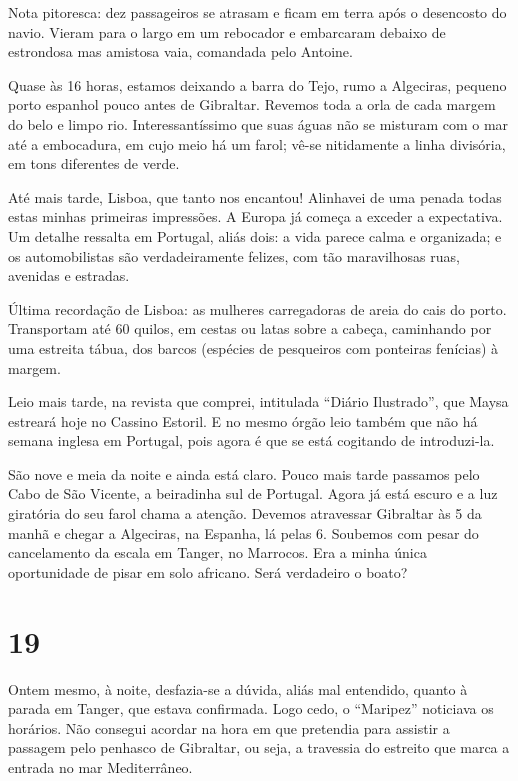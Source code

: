 Nota pitoresca: dez passageiros se atrasam e ficam em terra após o desencosto do navio. Vieram para o largo em um rebocador e embarcaram debaixo de estrondosa mas amistosa vaia, comandada pelo Antoine.

Quase às 16 horas, estamos deixando a barra do Tejo, rumo a Algeciras, pequeno porto espanhol pouco antes de Gibraltar. Revemos toda a orla de cada margem do belo e limpo rio. Interessantíssimo que suas águas não se misturam com o mar até a embocadura, em cujo meio há um farol; vê-se nitidamente a linha divisória, em tons diferentes de verde.

Até mais tarde, Lisboa, que tanto nos encantou! Alinhavei de uma penada todas estas minhas primeiras impressões. A Europa já começa a exceder a expectativa. Um detalhe ressalta em Portugal, aliás dois: a vida parece calma e organizada; e os automobilistas são verdadeiramente felizes, com tão maravilhosas ruas, avenidas e estradas.

Última recordação de Lisboa: as mulheres carregadoras de areia do cais do porto. Transportam até 60 quilos, em cestas ou latas sobre a cabeça, caminhando por uma estreita tábua, dos barcos (espécies de pesqueiros com ponteiras fenícias) à margem.

Leio mais tarde, na revista que comprei, intitulada ``Diário Ilustrado'', que Maysa estreará hoje no Cassino Estoril. E no mesmo órgão leio também que não há semana inglesa em Portugal, pois agora é que se está cogitando de introduzi-la.

São nove e meia da noite e ainda está claro. Pouco mais tarde passamos pelo Cabo de São Vicente, a beiradinha sul de Portugal. Agora já está escuro e a luz giratória do seu farol chama a atenção. Devemos atravessar Gibraltar às 5 da manhã e chegar a Algeciras, na Espanha, lá pelas 6. Soubemos com pesar do cancelamento da escala em Tanger, no Marrocos. Era a minha única oportunidade de pisar em solo africano. Será verdadeiro o boato?

\section*{19 \adfflatleafright {}}

Ontem mesmo, à noite, desfazia-se a dúvida, aliás mal entendido, quanto à parada em Tanger, que estava confirmada. Logo cedo, o ``Maripez'' noticiava os horários. Não consegui acordar na hora em que pretendia para assistir a passagem pelo penhasco de Gibraltar, ou seja, a travessia do estreito que marca a entrada no mar Mediterrâneo.

